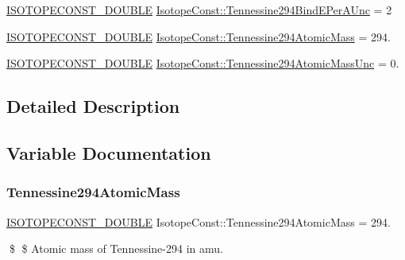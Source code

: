 \begin{DoxyCompactItemize}
\mbox{\hyperlink{group___isotope_const-_macros_ga8f45a7272ce02c0b4c65c44636ed719a}{I\+S\+O\+T\+O\+P\+E\+C\+O\+N\+S\+T\+\_\+\+D\+O\+U\+B\+LE}} \mbox{\hyperlink{group___isotope_const-_tennessine-_ts294_ga9874376a8c587d1a5e568c5a4edce0bd}{Isotope\+Const\+::\+Tennessine294\+Bind\+E\+Per\+A\+Unc}} = 2
\item 
\mbox{\hyperlink{group___isotope_const-_macros_ga8f45a7272ce02c0b4c65c44636ed719a}{I\+S\+O\+T\+O\+P\+E\+C\+O\+N\+S\+T\+\_\+\+D\+O\+U\+B\+LE}} \mbox{\hyperlink{group___isotope_const-_tennessine-_ts294_ga4c7e8d1c37b50f3d3f012fce74391ec1}{Isotope\+Const\+::\+Tennessine294\+Atomic\+Mass}} = 294.
\item 
\mbox{\hyperlink{group___isotope_const-_macros_ga8f45a7272ce02c0b4c65c44636ed719a}{I\+S\+O\+T\+O\+P\+E\+C\+O\+N\+S\+T\+\_\+\+D\+O\+U\+B\+LE}} \mbox{\hyperlink{group___isotope_const-_tennessine-_ts294_ga650a713244840b78607b1c3a6cedcf4d}{Isotope\+Const\+::\+Tennessine294\+Atomic\+Mass\+Unc}} = 0.
\end{DoxyCompactItemize}


\subsection{Detailed Description}


\subsection{Variable Documentation}
\mbox{\label{group___isotope_const-_tennessine-_ts294_ga4c7e8d1c37b50f3d3f012fce74391ec1}} 
\subsubsection{\texorpdfstring{Tennessine294\+Atomic\+Mass}{Tennessine294AtomicMass}}
{\footnotesize\ttfamily \mbox{\hyperlink{group___isotope_const-_macros_ga8f45a7272ce02c0b4c65c44636ed719a}{I\+S\+O\+T\+O\+P\+E\+C\+O\+N\+S\+T\+\_\+\+D\+O\+U\+B\+LE}} Isotope\+Const\+::\+Tennessine294\+Atomic\+Mass = 294.}

\$ \$ Atomic mass of Tennessine-\/294 in amu. \mbox{\label{group___isotope_const-_tennessine-_ts294_ga650a713244840b78607b1c3a6cedcf4d}} 
